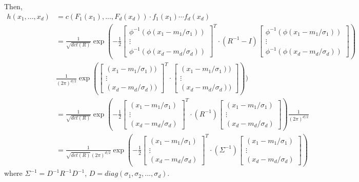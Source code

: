 \begin{refsection}
\begin{example}
Then,
\begin{align*}
h(x_1,...,x_d) &= c(F_1(x_1),...,F_d(x_d))\cdot f_1(x_1)\cdots f_d(x_d) \\
&= \frac{1}{\sqrt{det(R)}} \exp(-\frac{1}{2}
\begin{bmatrix}
\phi^{-1}(\phi(x_1-m_1/\sigma_1)) \\
\vdots\\
\phi^{-1}(\phi(x_d-m_d/\sigma_d))
\end{bmatrix}^T \cdot (R^{-1} - I) \begin{bmatrix}
\phi^{-1}(\phi(x_1-m_1/\sigma_1)) \\
\vdots\\
\phi^{-1}(\phi(x_d-m_d/\sigma_d))
\end{bmatrix})\\
&\frac{1}{(2\pi)^{d/2}}\exp(\begin{bmatrix}
(x_1-m_1/\sigma_1)) \\
\vdots\\
(x_d-m_d/\sigma_d))
\end{bmatrix}^T \cdot \begin{bmatrix}
(x_1-m_1/\sigma_1)) \\
\vdots\\
(x_d-m_d/\sigma_d))
\end{bmatrix}
)
)\\
&= \frac{1}{\sqrt{det(R)}} \exp(-\frac{1}{2}
\begin{bmatrix}
(x_1-m_1/\sigma_1) \\
\vdots\\
(x_d-m_d/\sigma_d)
\end{bmatrix}^T \cdot (R^{-1}) \begin{bmatrix}
(x_1-m_1/\sigma_1) \\
\vdots\\
(x_d-m_d/\sigma_d)
\end{bmatrix})
\frac{1}{(2\pi)^{d/2}}
\\
&= \frac{1}{\sqrt{det(R)}(2\pi)^{d/2}} \exp(-\frac{1}{2}
\begin{bmatrix}
(x_1-m_1/\sigma_1) \\
\vdots\\
(x_d-m_d/\sigma_d)
\end{bmatrix}^T \cdot (\Sigma^{-1}) \begin{bmatrix}
(x_1-m_1/\sigma_1) \\
\vdots\\
(x_d-m_d/\sigma_d)
\end{bmatrix})
\end{align*}
where $\Sigma^{-1} = D^{-1}R^{-1}D^{-1}$, $D = diag(\sigma_1,\sigma_2,...,\sigma_d)$.


\end{example}
\end{refsection}
